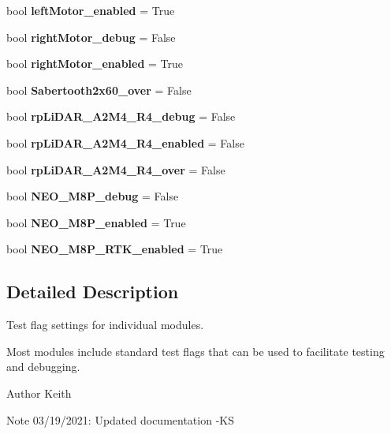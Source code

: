 \begin{DoxyCompactItemize}
bool {\bfseries left\+Motor\+\_\+enabled} = True
\item 
\mbox{\label{namespacemcs_1_1testFlags_a8303d4c3b11f4d5864a99fef04b5dfdd}} 
bool {\bfseries right\+Motor\+\_\+debug} = False
\item 
\mbox{\label{namespacemcs_1_1testFlags_a204eeb088274dbebc6aa7231b4b558a6}} 
bool {\bfseries right\+Motor\+\_\+enabled} = True
\item 
\mbox{\label{namespacemcs_1_1testFlags_ae427d76030761cae258a7661e0443efa}} 
bool {\bfseries Sabertooth2x60\+\_\+over} = False
\item 
\mbox{\label{namespacemcs_1_1testFlags_a2105e06eae8b90e8c641c7d017a9c929}} 
bool {\bfseries rp\+Li\+D\+A\+R\+\_\+\+A2\+M4\+\_\+\+R4\+\_\+debug} = False
\item 
\mbox{\label{namespacemcs_1_1testFlags_af278b4b6fd8a2fea0c332ef67791e27b}} 
bool {\bfseries rp\+Li\+D\+A\+R\+\_\+\+A2\+M4\+\_\+\+R4\+\_\+enabled} = False
\item 
\mbox{\label{namespacemcs_1_1testFlags_a02cc819dc142f4f6079a48f4d64ea981}} 
bool {\bfseries rp\+Li\+D\+A\+R\+\_\+\+A2\+M4\+\_\+\+R4\+\_\+over} = False
\item 
\mbox{\label{namespacemcs_1_1testFlags_a708552ae694ec4e9ad1960397960a306}} 
bool {\bfseries N\+E\+O\+\_\+\+M8\+P\+\_\+debug} = False
\item 
\mbox{\label{namespacemcs_1_1testFlags_a0e6a3be1c44d8c2dbbd3cae4365ce560}} 
bool {\bfseries N\+E\+O\+\_\+\+M8\+P\+\_\+enabled} = True
\item 
\mbox{\label{namespacemcs_1_1testFlags_a88736d7bafc6c3254aa50144891f498d}} 
bool {\bfseries N\+E\+O\+\_\+\+M8\+P\+\_\+\+R\+T\+K\+\_\+enabled} = True
\end{DoxyCompactItemize}


\subsection{Detailed Description}
Test flag settings for individual modules. 

Most modules include standard test flags that can be used to facilitate testing and debugging. \begin{DoxyAuthor}{Author}
Keith 
\end{DoxyAuthor}
\begin{DoxyNote}{Note}
03/19/2021\+: Updated documentation -\/\+KS 
\end{DoxyNote}
